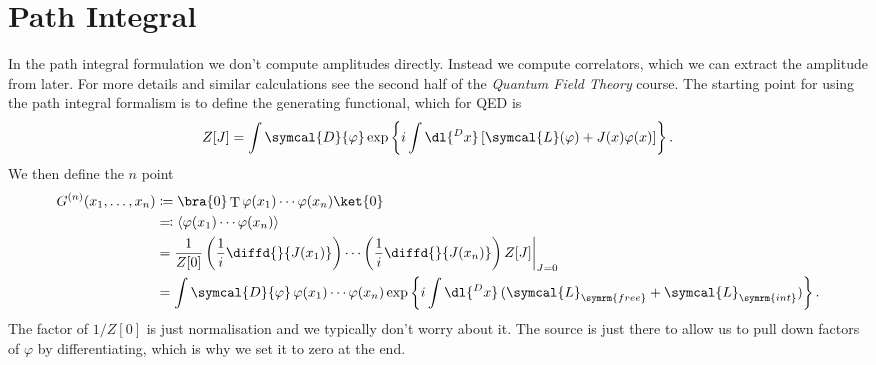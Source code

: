 \documentclass[fleqn]{NotesClass}
\newcommand*{\course}[1]{\textit{#1}}
\newcommand{\lagrangianDensity}{\symcal{L}}
\newcommand{\interaction}{{\symrm{int}}}
\DeclareMathOperator{\timeOrdering}{T}
\newcommand{\DL}[1]{\symcal{D}{#1}}
\DeclarePairedDelimiter{\correlator}{\langle}{\rangle}
\begin{document}
    \section{Path Integral}
    In the path integral formulation we don't compute amplitudes directly.
    Instead we compute correlators, which we can extract the amplitude from later.
    For more details and similar calculations see the second half of the \course{Quantum Field Theory} course.
    The starting point for using the path integral formalism is to define the generating functional, which for QED is
    \begin{equation}
        Z[J] = \int \DL{\varphi} \exp\left\{ i\int \dl{^Dx} \, [\lagrangianDensity(\varphi) + J(x)\varphi(x)] \right\}.
    \end{equation}
    We then define the \(n\) point 
    \begin{align}
        G^{(n)}(x_1, \dotsc, x_n) &\coloneqq \bra{0} \timeOrdering \varphi(x_1) \dotsm \varphi(x_n) \ket{0}\\
        &\eqqcolon \correlator{\varphi(x_1) \dotsm \varphi(x_n)}\\
        &= \frac{1}{Z[0]} \left( \frac{1}{i} \diffd{}{J(x_1)} \right) \dotsm \left( \frac{1}{i} \diffd{}{J(x_n)} \right) Z[J] \bigg|_{J = 0}\\
        &= \int \DL{\varphi} \, \varphi(x_1) \dotsm \varphi(x_n) \exp\left\{ i \int \dl{^Dx} \, (\lagrangianDensity_{\symrm{free}} + \lagrangianDensity_{\interaction}) \right\}.\notag
    \end{align}
    The factor of \(1/Z[0]\) is just normalisation and we typically don't worry about it.
    The source is just there to allow us to pull down factors of \(\varphi\) by differentiating, which is why we set it to zero at the end.
    
\end{document}
